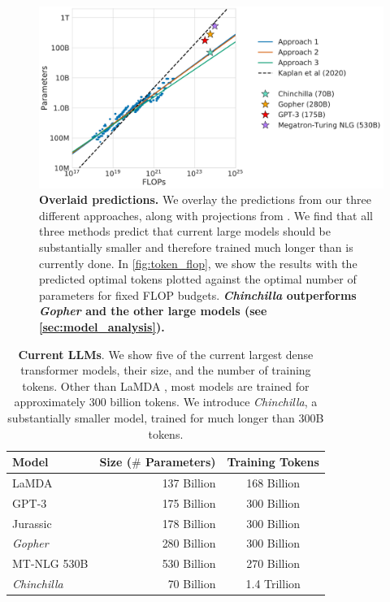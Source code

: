\documentclass[11pt, a4paper, logo, copyright, nonumbering]{deepmind}
\newcommand{\gopher}{\textit{Gopher}\xspace}
\newcommand{\chinchilla}{\textit{Chinchilla}\xspace}
\newcommand{\mtnlg}{MT-NLG 530B\xspace}
\begin{document}
\begin{figure}[t]
    \centering
    \includegraphics[width=.9\textwidth, trim=-5cm 0 0 0]{figures/combined_predictions_v9.pdf}
    \caption{\textbf{Overlaid predictions.}
    We overlay the predictions from our three different approaches, along with projections from \citet{kaplan2020scaling}. We find that all three methods predict that current large models should be substantially smaller and therefore trained much longer than is currently done.
    In \autoref{fig:token_flop}, we show the results with the predicted optimal tokens plotted against the optimal number of parameters for fixed FLOP budgets.
    \textbf{\chinchilla outperforms \gopher and the other large models (see \autoref{sec:model_analysis}).}
    }
    \label{fig:combined_predictions}
\end{figure}



\begin{table}[t]
    \caption{\textbf{Current LLMs}.
    We show five of the current largest dense transformer models, their size, and the number of training tokens. Other than LaMDA \citep{thoppilan2022lamda}, most models are trained for approximately 300 billion tokens. 
    We introduce \chinchilla, a substantially smaller model, trained for much longer than 300B tokens.
    }
    \label{tab:llms}
\centering
\begin{tabular}{l r c}
\toprule
Model & Size ($\#$ Parameters) & Training Tokens \\
\midrule
LaMDA \citep{thoppilan2022lamda} & 137 Billion &168 Billion \\
GPT-3 \citep{gpt3} & 175 Billion & 300 Billion \\
Jurassic \citep{jurassic} & 178 Billion & 300 Billion \\
\gopher \citep{rae2021gopher} & 280 Billion & 300 Billion \\
\mtnlg \citep{nlg530b} & 530 Billion & 270 Billion\\
\midrule
\chinchilla & 70 Billion & 1.4 Trillion\\
\bottomrule
\end{tabular}
\end{table}
\end{document}
